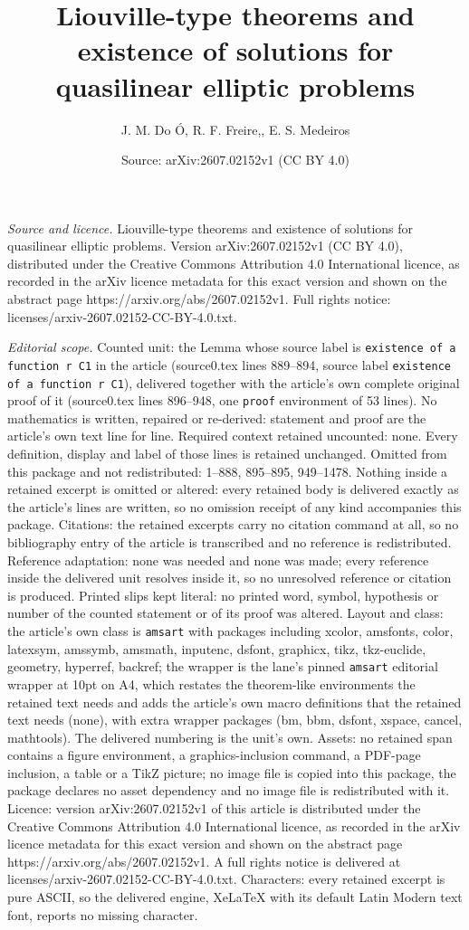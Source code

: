 \documentclass[10pt,a4paper]{amsart}
\title[Liouville-type theorems and existence of solutions for quasi]{Liouville-type theorems and existence of solutions for quasilinear elliptic problems}
\author{J. M. Do \'O, R. F. Freire,, E. S. Medeiros}
\date{Source: arXiv:2607.02152v1 (CC BY 4.0)}
\begin{document}
\maketitle

\noindent\emph{Source and licence.} Liouville-type theorems and existence of solutions for quasilinear elliptic problems. Version arXiv:2607.02152v1 (CC BY 4.0), distributed under the Creative Commons Attribution 4.0 International licence, as recorded in the arXiv licence metadata for this exact version and shown on the abstract page https://arxiv.org/abs/2607.02152v1. Full rights notice: licenses/arxiv-2607.02152-CC-BY-4.0.txt.\par\smallskip

\noindent\textit{Editorial scope.} Counted unit: the Lemma whose source label is \texttt{existence of a function r C1} in the article (source0.tex lines 889--894, source label \texttt{existence of a function r C1}), delivered together with the article's own complete original proof of it (source0.tex lines 896--948, one \texttt{proof} environment of 53 lines). No mathematics is written, repaired or re-derived: statement and proof are the article's own text line for line. Required context retained uncounted: none. Every definition, display and label of those lines is retained unchanged. Omitted from this package and not redistributed: 1--888, 895--895, 949--1478. Nothing inside a retained excerpt is omitted or altered: every retained body is delivered exactly as the article's lines are written, so no omission receipt of any kind accompanies this package. Citations: the retained excerpts carry no citation command at all, so no bibliography entry of the article is transcribed and no reference is redistributed. Reference adaptation: none was needed and none was made; every reference inside the delivered unit resolves inside it, so no unresolved reference or citation is produced. Printed slips kept literal: no printed word, symbol, hypothesis or number of the counted statement or of its proof was altered. Layout and class: the article's own class is \texttt{amsart} with packages including xcolor, amsfonts, color, latexsym, amssymb, amsmath, inputenc, dsfont, graphicx, tikz, tkz-euclide, geometry, hyperref, backref; the wrapper is the lane's pinned \texttt{amsart} editorial wrapper at 10pt on A4, which restates the theorem-like environments the retained text needs and adds the article's own macro definitions that the retained text needs (none), with extra wrapper packages (bm, bbm, dsfont, xspace, cancel, mathtools). The delivered numbering is the unit's own. Assets: no retained span contains a figure environment, a graphics-inclusion command, a PDF-page inclusion, a table or a TikZ picture; no image file is copied into this package, the package declares no asset dependency and no image file is redistributed with it. Licence: version arXiv:2607.02152v1 of this article is distributed under the Creative Commons Attribution 4.0 International licence, as recorded in the arXiv licence metadata for this exact version and shown on the abstract page https://arxiv.org/abs/2607.02152v1. A full rights notice is delivered at licenses/arxiv-2607.02152-CC-BY-4.0.txt. Characters: every retained excerpt is pure ASCII, so the delivered engine, XeLaTeX with its default Latin Modern text font, reports no missing character.
\end{document}
